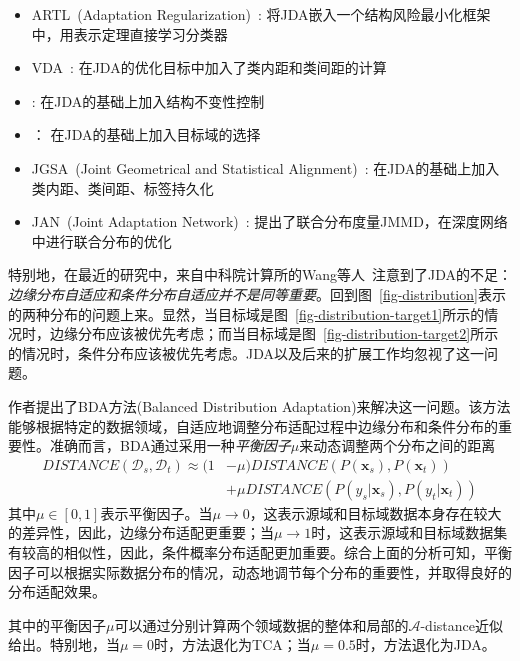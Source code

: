 \begin{itemize}
	\item ARTL~(Adaptation Regularization)~\cite{long2014adaptation}: 将JDA嵌入一个结构风险最小化框架中，用表示定理直接学习分类器
	\item VDA~\cite{tahmoresnezhad2016visual}: 在JDA的优化目标中加入了类内距和类间距的计算
	\item \cite{hsiao2016learning}: 在JDA的基础上加入结构不变性控制
	\item \cite{hou2015unsupervised}： 在JDA的基础上加入目标域的选择
	\item JGSA~(Joint Geometrical and Statistical Alignment)~\cite{zhang2017joint}: 在JDA的基础上加入类内距、类间距、标签持久化
	\item JAN~(Joint Adaptation Network)~\cite{long2017deep}: 提出了联合分布度量JMMD，在深度网络中进行联合分布的优化
\end{itemize}

特别地，在最近的研究中，来自中科院计算所的Wang等人~\cite{wang2017balanced}注意到了JDA的不足：\textit{边缘分布自适应和条件分布自适应并不是同等重要}。回到图~\ref{fig-distribution}表示的两种分布的问题上来。显然，当目标域是图~\ref{fig-distribution-target1}所示的情况时，边缘分布应该被优先考虑；而当目标域是图~\ref{fig-distribution-target2}所示的情况时，条件分布应该被优先考虑。JDA以及后来的扩展工作均忽视了这一问题。

作者提出了BDA方法(Balanced Distribution Adaptation)来解决这一问题。该方法能够根据特定的数据领域，自适应地调整分布适配过程中边缘分布和条件分布的重要性。准确而言，BDA通过采用一种\textit{平衡因子}$\mu$来动态调整两个分布之间的距离
\begin{equation}
\label{equ-mummd}
\begin{split}
DISTANCE(\mathcal{D}_s,\mathcal{D}_t) \approx  (1 &- \mu)DISTANCE(P(\mathbf{x}_s),P(\mathbf{x}_t))\\
&+ \mu DISTANCE(P(y_s|\mathbf{x}_s),P(y_t|\mathbf{x}_t))
\end{split}
\end{equation}
其中$\mu \in [0,1]$表示平衡因子。当$\mu \rightarrow 0$，这表示源域和目标域数据本身存在较大的差异性，因此，边缘分布适配更重要；当$\mu \rightarrow 1$时，这表示源域和目标域数据集有较高的相似性，因此，条件概率分布适配更加重要。综合上面的分析可知，平衡因子可以根据实际数据分布的情况，动态地调节每个分布的重要性，并取得良好的分布适配效果。

其中的平衡因子$\mu$可以通过分别计算两个领域数据的整体和局部的$\mathcal{A}$-distance近似给出。特别地，当$\mu = 0$时，方法退化为TCA；当$\mu = 0.5$时，方法退化为JDA。

